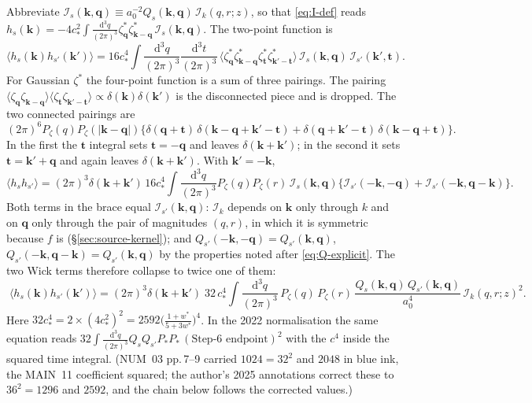 \documentclass[11pt,a4paper]{article}
\newcommand{\dd}{\mathrm{d}}
\newcommand{\vk}{\mathbf{k}}
\newcommand{\vq}{\mathbf{q}}
\newcommand{\vt}{\mathbf{t}}
\newcommand{\wstar}{w^{*}}
\newcommand{\cstar}{c_{*}}
\newcommand{\note}[1]{\textsf{#1}}
\theoremstyle{remark}
\begin{document}
Abbreviate $\mathcal{I}_s(\vk,\vq)\equiv a_0^{-2}Q_s(\vk,\vq)\,\mathcal{I}_k(q,r;z)$, so that \eqref{eq:I-def} reads $h_s(\vk) = -4\cstar^2\int\frac{\dd^3q}{(2\pi)^3}\zeta^*_{\vq}\zeta^*_{\vk-\vq}\,\mathcal{I}_s(\vk,\vq)$. The two-point function is
\begin{equation}
\big\langle h_s(\vk)h_{s'}(\vk')\big\rangle = 16\cstar^4\int\frac{\dd^3q}{(2\pi)^3}\frac{\dd^3t}{(2\pi)^3}\,
\big\langle\zeta^*_{\vq}\zeta^*_{\vk-\vq}\zeta^*_{\vt}\zeta^*_{\vk'-\vt}\big\rangle\,\mathcal{I}_s(\vk,\vq)\,\mathcal{I}_{s'}(\vk',\vt).
\end{equation}
For Gaussian $\zeta^*$ the four-point function is a sum of three pairings. The pairing $\langle\zeta_{\vq}\zeta_{\vk-\vq}\rangle\langle\zeta_{\vt}\zeta_{\vk'-\vt}\rangle\propto\delta(\vk)\delta(\vk')$ is the disconnected piece and is dropped. The two connected pairings are
\begin{equation}
(2\pi)^6P_\zeta(q)P_\zeta(|\vk-\vq|)\Big\{\delta(\vq+\vt)\,\delta(\vk-\vq+\vk'-\vt) + \delta(\vq+\vk'-\vt)\,\delta(\vk-\vq+\vt)\Big\}.
\end{equation}
In the first the $\vt$ integral sets $\vt = -\vq$ and leaves $\delta(\vk+\vk')$; in the second it sets $\vt = \vk'+\vq$ and again leaves $\delta(\vk+\vk')$. With $\vk' = -\vk$,
\begin{equation}
\big\langle h_sh_{s'}\big\rangle = (2\pi)^3\delta(\vk+\vk')\,16\cstar^4\int\frac{\dd^3q}{(2\pi)^3}P_\zeta(q)P_\zeta(r)\,\mathcal{I}_s(\vk,\vq)\Big\{\mathcal{I}_{s'}(-\vk,-\vq) + \mathcal{I}_{s'}(-\vk,\vq-\vk)\Big\}.
\end{equation}
Both terms in the brace equal $\mathcal{I}_{s'}(\vk,\vq)$: $\mathcal{I}_k$ depends on $\vk$ only through $k$ and on $\vq$ only through the pair of magnitudes $(q,r)$, in which it is symmetric because $f$ is (\S\ref{sec:source-kernel}); and $Q_{s'}(-\vk,-\vq) = Q_{s'}(\vk,\vq)$, $Q_{s'}(-\vk,\vq-\vk) = Q_{s'}(\vk,\vq)$ by the properties noted after \eqref{eq:Q-explicit}. The two Wick terms therefore collapse to twice one of them:
\begin{equation}
\boxed{\;
\big\langle h_s(\vk)h_{s'}(\vk')\big\rangle = (2\pi)^3\delta(\vk+\vk')\;32\,\cstar^4\int\frac{\dd^3q}{(2\pi)^3}\,P_\zeta(q)\,P_\zeta(r)\,\frac{Q_s(\vk,\vq)\,Q_{s'}(\vk,\vq)}{a_0^4}\,\mathcal{I}_k(q,r;z)^2 .\;}
\label{eq:hh-3d}
\end{equation}
Here $32\cstar^4 = 2\times(4\cstar^2)^2 = 2592\big(\tfrac{1+\wstar}{5+3\wstar}\big)^4$. In the 2022 normalisation the same equation reads $32\int\frac{\dd^3q}{(2\pi)^3}Q_sQ_{s'}P_*P_*\,(\text{Step-6 endpoint})^2$ with the $c^4$ inside the squared time integral. (\note{NUM}~03 pp.\,7--9 carried $1024 = 32^2$ and $2048$ in blue ink, the \note{MAIN}~11 coefficient squared; the author's 2025 annotations correct these to $36^2 = 1296$ and $2592$, and the chain below follows the corrected values.)
\end{document}
